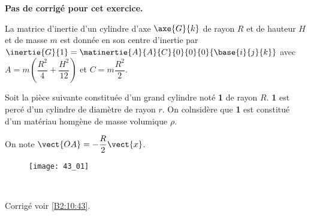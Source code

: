 \normaltrue \difficilefalse \tdifficilefalse
\correctionfalse


\setcounter{numques}{0}
\ifcorrection
\else
\textbf{Pas de corrigé pour cet exercice.}
\fi




\ifprof
\else
La matrice d'inertie d'un cylindre d'axe $\axe{G}{k}$ de rayon $R$ et de hauteur $H$ et de masse $m$ est donnée en son centre d'inertie par 
$\inertie{G}{1}=\matinertie{A}{A}{C}{0}{0}{0}{\base{i}{j}{k}}$ avec $A=m\left(\dfrac{R^2}{4}+\dfrac{H^2}{12} \right)$ et $C=m\dfrac{R^2}{2}$. 

Soit la pièce suivante constituée d'un grand cylindre noté \textbf{1} de rayon $R$.  \textbf{1} est percé d'un cylindre de diamètre de rayon $r$. On colnsidère que \textbf{1} est constitué d'un matériau homgène de masse volumique $\rho$. 

On note $\vect{OA}=-\dfrac{R}{2}\vect{x}$. 
\begin{figure}[H]
\centering
\texttt{[image: 43\_01]}
\end{figure}
\fi


\ifprof
\else
\fi

\ifprof ~\\
\else
\fi


\ifprof
\else
\begin{flushright}
\footnotesize{Corrigé voir \ref{B2:10:43}.}
\end{flushright}%
\fi